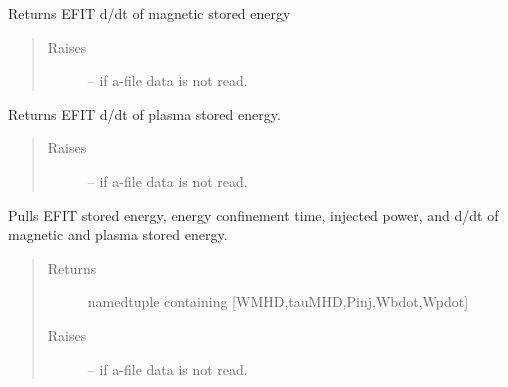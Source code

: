 \documentclass[letterpaper,10pt,english]{sphinxmanual}
\begin{document}
\begin{fulllineitems}
\begin{fulllineitems}
\end{fulllineitems}


\begin{fulllineitems}
\label{eqtools:eqtools.eqdskreader.EqdskReader.getWbdot}
Returns EFIT d/dt of magnetic stored energy
\begin{quote}\begin{description}
\item[{Raises}] \leavevmode
{} -- if a-file data is not read.

\end{description}\end{quote}

\end{fulllineitems}


\begin{fulllineitems}
\label{eqtools:eqtools.eqdskreader.EqdskReader.getWpdot}
Returns EFIT d/dt of plasma stored energy.
\begin{quote}\begin{description}
\item[{Raises}] \leavevmode
{} -- if a-file data is not read.

\end{description}\end{quote}

\end{fulllineitems}


\begin{fulllineitems}
\label{eqtools:eqtools.eqdskreader.EqdskReader.getEnergy}
Pulls EFIT stored energy, energy confinement time, injected power, and d/dt of magnetic and plasma stored energy.
\begin{quote}\begin{description}
\item[{Returns}] \leavevmode
namedtuple containing {[}WMHD,tauMHD,Pinj,Wbdot,Wpdot{]}

\item[{Raises}] \leavevmode
{} -- if a-file data is not read.


\end{description}
\end{quote}
\end{fulllineitems}
\end{fulllineitems}
\end{document}
